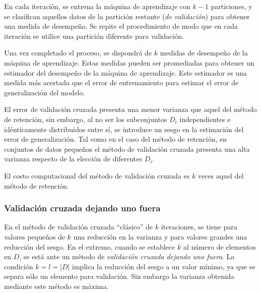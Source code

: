 \documentclass[12pt,bibliography=oldstyle,DIV=12,parskip=half-]{scrreprt}
\newcommand{\e}{\emph}
\begin{document}


En cada iteración, se entrena la máquina de aprendizaje con $k-1$
particiones, y se clasifican aquellos datos de la partición restante
(\e{de validación}) para obtener una medida de desempeño. Se repite el
procedimiento de modo que en cada iteración se utilice una partición
diferente para validación.

Una vez completado el proceso, se dispondrá de $k$ medidas de
desempeño de la máquina de aprendizaje. Estas medidas pueden ser
promediadas para obtener un estimador del desempeño de la máquina de
aprendizaje. Este estimador es una medida más acertada que el error de
entrenamiento para estimar el error de generalización del modelo.

El error de validación cruzada presenta una menor varianza que aquel
del método de retención, sin embargo, al no ser los subconjuntos $D_i$
independientes e idénticamente distribuidos entre sí, se introduce un
sesgo en la estimación del error de generalización.  Tal como en el
caso del método de retención, en conjuntos de datos pequeños el método
de validación cruzada presenta una alta varianza respecto de la
elección de diferentes $D_i$.

El costo computacional del método de validación cruzada es $k$ veces
aquel del método de retención.
%
\subsubsection{Validación cruzada dejando uno fuera}
%
En el método de validación cruzada ``clásico'' de $k$ iteraciones, se
tiene para valores pequeños de $k$ una reducción en la varianza y para
valores grandes una reducción del sesgo. En el extremo, cuando se
establece $k$ al número de elementos en $D$, se está ante un método de
\emph{validación cruzada dejando uno fuera}. La condición $k=l=|D|$
implica la reducción del sesgo a un valor mínimo, ya que se separa
sólo un elemento para validación.  Sin embargo la varianza obtenida
mediante este método es máxima.
\end{document}
